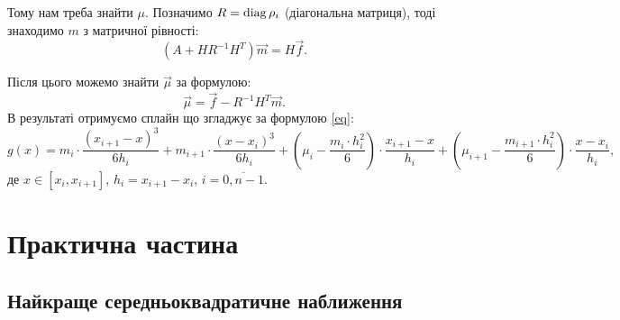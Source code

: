 Тому нам треба знайти $\mu$. Позначимо $R = \operatorname{diag} \rho_i$ (діагональна матриця), тоді знаходимо $m$ з матричної рівності: \[ (A + H R^{-1} H^T) \vec m = H \vec f.\]

Після цього можемо знайти $\vec \mu$ за формулою: \[\vec \mu = \vec f - R^{-1} H^{T} \vec m.\] В результаті отримуємо сплайн що згладжує за формулою \eqref{eq}: \[ g(x) = m_i \cdot \frac{(x_{i + 1} - x)^3}{6 h_i} + m_{i + 1} \cdot \frac{(x - x_i)^3}{6 h_i} + \left( \mu_i - \frac{m_i \cdot h_i^2}{6} \right) \cdot \frac{x_{i + 1} - x}{h_i} + \left( \mu_{i + 1} - \frac{m_{i + 1} \cdot h_i^2}{6}\right) \cdot \frac{x - x_i}{h_i}, \] де $x \in [x_i, x_{i + 1}]$, $h_i = x_{i + 1} - x_i$, $i = \overline{0, n - 1}$.

\newpage

\section{Практична частина}

\subsection{Найкраще середньоквадратичне наближення}



